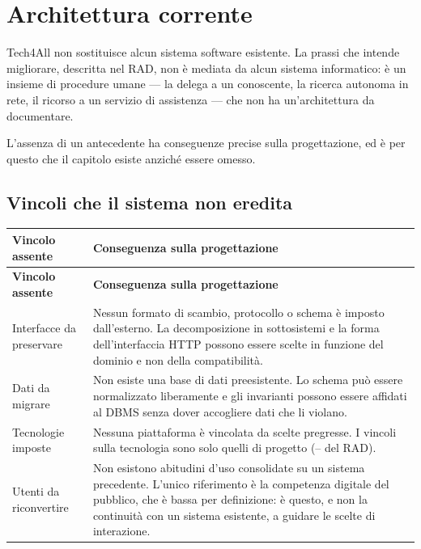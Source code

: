 \chapter{Architettura corrente}
\label{cap:sdd-architettura-corrente}

Tech4All non sostituisce alcun sistema software esistente. La prassi che
intende migliorare, descritta nel RAD, non è mediata da alcun sistema
informatico: è un insieme di procedure umane — la delega a un conoscente, la
ricerca autonoma in rete, il ricorso a un servizio di assistenza — che non ha
un'architettura da documentare.

L'assenza di un antecedente ha conseguenze precise sulla progettazione, ed è
per questo che il capitolo esiste anziché essere omesso.

\section{Vincoli che il sistema non eredita}

\begin{longtable}{@{}L{4.6cm} L{9.8cm}@{}}
\toprule
\textbf{Vincolo assente} & \textbf{Conseguenza sulla progettazione} \\
\midrule
\endfirsthead
\toprule
\textbf{Vincolo assente} & \textbf{Conseguenza sulla progettazione} \\
\midrule
\endhead
\bottomrule
\endlastfoot

Interfacce da preservare &
Nessun formato di scambio, protocollo o schema è imposto dall'esterno. La
decomposizione in sottosistemi e la forma dell'interfaccia HTTP possono essere
scelte in funzione del dominio e non della compatibilità. \\

Dati da migrare &
Non esiste una base di dati preesistente. Lo schema può essere normalizzato
liberamente e gli invarianti possono essere affidati al DBMS senza dover
accogliere dati che li violano. \\

Tecnologie imposte &
Nessuna piattaforma è vincolata da scelte pregresse. I vincoli sulla
tecnologia sono solo quelli di progetto (-- del RAD). \\

Utenti da riconvertire &
Non esistono abitudini d'uso consolidate su un sistema precedente. L'unico
riferimento è la competenza digitale del pubblico, che è bassa per
definizione: è questo, e non la continuità con un sistema esistente, a
guidare le scelte di interazione. \\

\end{longtable}

